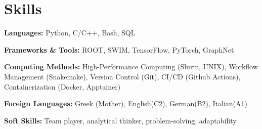 
\section{Skills}
  \vspace{2pt}
  \resumeSubHeadingListStart
    \small{\item{
        
        \textbf{Languages:}{ Python, C/C++, Bash, SQL} \\ \vspace{1.25pt}

        \textbf{Frameworks \& Tools:}{ ROOT, SWIM, TensorFlow, PyTorch, GraphNet} 
        
        \textbf{Computing Methods:}{ High-Performance Computing (Slurm, UNIX), Workflow Management (Snakemake), Version Control (Git), CI/CD (Github Actions), Containerization (Docker, Apptainer)} \\ \vspace{1.25pt}

        \textbf{Foreign Languages:} {Greek (Mother), English(C2), German(B2), Italian(A1)} \\ \vspace{1.25pt}

        \textbf{Soft Skills:}{ Team player, analytical thinker, problem-solving, adaptability} \\ \vspace{1.25pt}
    }}
  \resumeSubHeadingListEnd